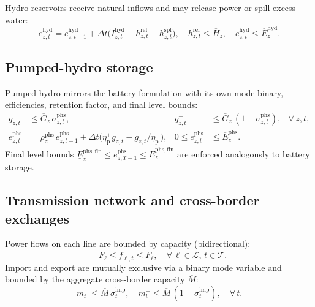 \documentclass{article}
\begin{document}
Hydro reservoirs receive natural inflows and may release power or spill excess water:
\begin{equation}
e^{\mathrm{hyd}}_{z,t} = e^{\mathrm{hyd}}_{z,t-1} + \Delta t \bigl( I^{\mathrm{hyd}}_{z,t} - h^{\mathrm{rel}}_{z,t} - h^{\mathrm{spl}}_{z,t} \bigr), \quad
h^{\mathrm{rel}}_{z,t} \leq \overline{H}_z, \quad
e^{\mathrm{hyd}}_{z,t} \leq \overline{E}^{\mathrm{hyd}}_z.
\label{eq:hydro_reservoir}
\end{equation}

\subsection{Pumped-hydro storage}

Pumped-hydro mirrors the battery formulation with its own mode binary, efficiencies, retention factor, and final level bounds:
\begin{align}
g^{+}_{z,t} &\leq \overline{G}_z \, \sigma^{\mathrm{phs}}_{z,t}, &
g^{-}_{z,t} &\leq \overline{G}_z \, (1 - \sigma^{\mathrm{phs}}_{z,t}), & \forall\, z,t, \label{eq:pumped_mode} \\
e^{\mathrm{phs}}_{z,t} &= \rho^{\mathrm{phs}}_z \, e^{\mathrm{phs}}_{z,t-1} + \Delta t \bigl( \eta^{+}_{\mathrm{p}} g^{+}_{z,t} - g^{-}_{z,t} / \eta^{-}_{\mathrm{p}} \bigr), &
0 \leq e^{\mathrm{phs}}_{z,t} &\leq \overline{E}^{\mathrm{phs}}_z. \label{eq:pumped_soc}
\end{align}
Final level bounds $\underline{E}^{\mathrm{phs,fin}}_z \leq e^{\mathrm{phs}}_{z,T-1} \leq \overline{E}^{\mathrm{phs,fin}}_z$ are enforced analogously to battery storage.

\subsection{Transmission network and cross-border exchanges}

Power flows on each line are bounded by capacity (bidirectional):
\begin{equation}
-\overline{F}_\ell \leq f_{\ell,t} \leq \overline{F}_\ell, \quad \forall\, \ell \in \mathcal{L},\, t \in \mathcal{T}.
\label{eq:transmission}
\end{equation}
Import and export are mutually exclusive via a binary mode variable and bounded by the aggregate cross-border capacity $\overline{M}$:
\begin{equation}
m^{+}_{t} \leq \overline{M} \, \sigma^{\mathrm{imp}}_{t}, \quad
m^{-}_{t} \leq \overline{M} \, (1 - \sigma^{\mathrm{imp}}_{t}), \quad \forall\, t.
\label{eq:import_export}
\end{equation}
\end{document}
